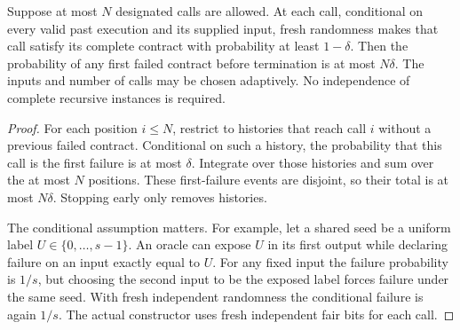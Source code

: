 \begin{lemma}
\label{lem:op3-capped-adaptive-confidence}
Suppose at most $N$ designated calls are allowed. At each call, conditional
on every valid past execution and its supplied input, fresh randomness
makes that call satisfy its complete contract with probability at least
$1-\delta$. Then the probability of any first failed contract before
termination is at most $N\delta$. The inputs and number of calls may
be chosen adaptively. No independence of complete recursive instances
is required.
\end{lemma}
\begin{proof}
For each position $i\leq N$, restrict to histories that reach call $i$
without a previous failed contract. Conditional on such a history, the
probability that this call is the first failure is at most $\delta$.
Integrate over those histories and sum over the at most $N$ positions.
These first-failure events are disjoint, so their total is at most
$N\delta$. Stopping early only removes histories.

The conditional assumption matters. For example, let a shared seed be a
uniform label $U\in\{0,\ldots,s-1\}$. An oracle can expose $U$ in its
first output while declaring failure on an input exactly equal to $U$.
For any fixed input the failure probability is $1/s$, but choosing the
second input to be the exposed label forces failure under the same seed.
With fresh independent randomness the conditional failure is again $1/s$.
The actual constructor uses fresh independent fair bits for each call.
\end{proof}


